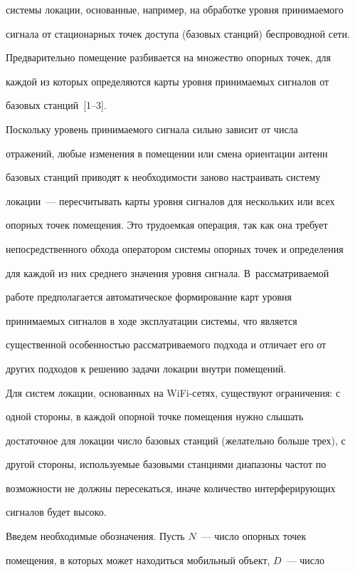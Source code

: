 системы локации, основанные, например, на обработке уровня принимаемого

сигнала от стационарных точек доступа (базовых станций) беспроводной сети.

Предварительно помещение разбивается на множество опорных точек, для

каж\-дой из которых определяются карты уровня принимаемых сигналов от

базовых станций~[1--3].



 Поскольку уровень принимаемого сигнала сильно зависит от числа

отражений, любые изменения в помещении или смена ориентации антенн

базовых станций приводят к необходимости заново настраивать систему

локации~--- пересчитывать карты уровня сигналов для нескольких или всех

опорных точек помещения. Это трудоемкая операция, так как она требует

непосредственного обхода оператором системы опорных точек и определения

для каждой из них среднего значения уровня сигнала. В~рассматриваемой

работе предполагается автоматическое формирование карт уровня

принимаемых сигналов в ходе эксплуатации системы, что является

существенной особенностью рассматриваемого подхода и отличает его от

других подходов к решению задачи локации внутри помещений.



 Для систем локации, основанных на WiFi-сетях, существуют ограничения: с

одной стороны, в каждой опорной точке помещения нужно слышать

достаточное для локации число базовых станций (желательно больше трех), с

другой стороны, используемые базовыми станциями диапазоны частот по

возможности не должны пересекаться, иначе количество интерферирующих

сигналов будет высоко.



 Введем необходимые обозначения. Пусть $N$~--- число опорных точек

помещения, в которых может находиться мобильный объект, $D$~--- число

